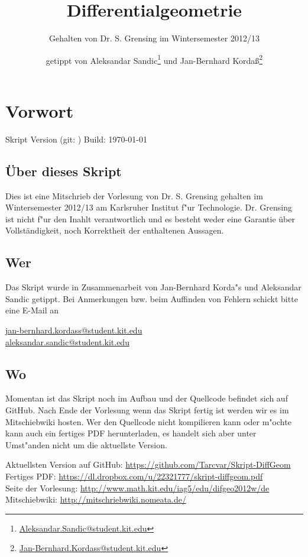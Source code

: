 \documentclass[paper=A4, twoside, chapterprefix=true, bibliography=totoc, headsepline]{scrbook}
\title{Differentialgeometrie}
\subtitle{Gehalten von Dr. S. Grensing im Wintersemester 2012/13}
\author{getippt von Aleksandar Sandic\thanks{\href{mailto:aleksandar.sandic@student.kit.edu}{Aleksandar.Sandic@student.kit.edu}} und Jan-Bernhard Korda\ss\thanks{\href{mailto:jan-bernhard.kordass@student.kit.edu}{Jan-Bernhard.Kordass@student.kit.edu}}}
\begin{document}
\maketitle

\setlength\parskip{0.6pt}
\tableofcontents

\chapter*{Vorwort}
\setlength\parskip{\smallskipamount} Skript Version \textbf{\GITVersionTag}
(git: \GITAbrHash) \quad Build: \today

\section*{\"Uber dieses Skript}
Dies ist eine Mitschrieb der Vorlesung 
von Dr. S. Grensing gehalten im Wintersemester 2012/13 am Karlsruher
Institut f"ur Technologie. Dr. Grensing ist nicht f"ur den Inahlt
verantwortlich und es besteht weder eine Garantie über
Vollständigkeit, noch Korrektheit der enthaltenen Aussagen.

\section*{Wer}
Das Skript wurde in Zusammenarbeit von Jan-Bernhard Korda"s und
Aleksandar Sandic getippt. Bei Anmerkungen bzw. beim Auffinden von
Fehlern schickt bitte eine E-Mail an
\begin{center}
  \href{mailto:jan-bernhard.kordass@student.kit.edu}{jan-bernhard.kordass@student.kit.edu}\\
  \href{mailto:aleksandar.sandic@student.kit.edu}{aleksandar.sandic@student.kit.edu}
\end{center}

\section*{Wo}
Momentan ist das Skript noch im Aufbau und der Quellcode befindet sich
auf GitHub. Nach Ende der Vorlesung wenn das Skript fertig ist werden
wir es im Mitschiebwiki hosten. Wer den Quellcode nicht kompilieren
kann oder m"ochte kann auch ein fertiges PDF herunterladen, es handelt
sich aber unter Umst"anden nicht um die aktuellste Version.

Aktuellsten Version auf GitHub: \url{https://github.com/Tarcvar/Skript-DiffGeom}\\
Fertiges PDF: \url{https://dl.dropbox.com/u/22321777/skript-diffgeom.pdf}\\
Seite der Vorlesung: \url{http://www.math.kit.edu/iag5/edu/difgeo2012w/de}\\
Mitschiebwiki: \url{http://mitschriebwiki.nomeata.de/}
\end{document}
